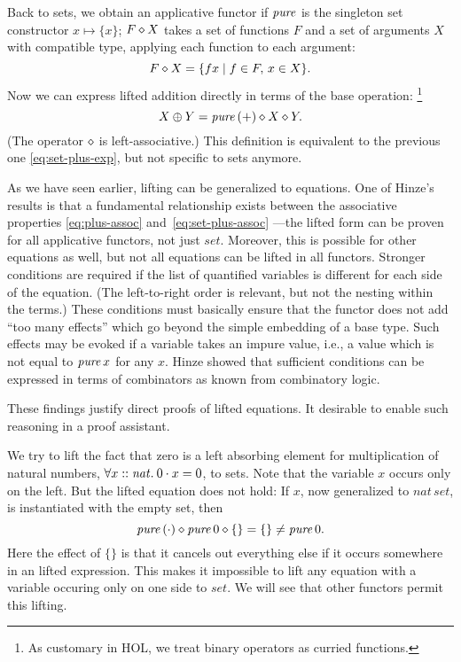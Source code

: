 \addtocounter{example}{-1}
\begin{example}[continued]
Back to sets, we obtain an applicative functor if $\operatorname{\mathit{pure}}$ is the singleton set
constructor $x \mapsto \{x\}$;
$F \diamond X$ takes a set of functions $F$ and a set of arguments $X$
with compatible type, applying each function to each argument:
\begin{equation}\label{eq:set-ap}
	F \diamond X = \{f x\mid f \in F,\, x \in X\}.
\end{equation}
Now we can express lifted addition directly in terms of the base operation:%
\footnote{As customary in HOL, we treat binary operators as curried functions.}
\begin{equation}\label{eq:set-plus}
	X \oplus Y = \operatorname{\mathit{pure}}{(+)} \diamond X \diamond Y.
\end{equation}
(The operator $\diamond$ is left-associative.)
This definition is equivalent to the previous one \eqref{eq:set-plus-exp},
but not specific to sets anymore.
\end{example}

As we have seen earlier, lifting can be generalized to equations.
One of Hinze's results is that a fundamental relationship exists between the
associative properties \eqref{eq:plus-assoc} and~\eqref{eq:set-plus-assoc}%
---the lifted form can be proven for all applicative functors, not just
$\mathit{set}$.
Moreover, this is possible for other equations as well, but not all equations
can be lifted in all functors.
Stronger conditions are required if the list of quantified variables is
different for each side of the equation.
(The left-to-right order is relevant, but not the nesting within the terms.)
These conditions must basically ensure that the functor does not add ``too many
effects'' which go beyond the simple embedding of a base type.
Such effects may be evoked if a variable takes an impure value, i.e., a value
which is not equal to $\operatorname{\mathit{pure}} x$ for any $x$.
Hinze showed that sufficient conditions can be expressed in terms of combinators
as known from combinatory logic.

These findings justify direct proofs of lifted equations.
It desirable to enable such reasoning in a proof assistant.

\begin{example}\label{exmp:set-counterexmp}
We try to lift the fact that zero is a left absorbing element for
multiplication of natural numbers, $\forall x \mathrel{::} \mathit{nat}.\>0 \cdot x = 0$,
to sets.
Note that the variable $x$ occurs only on the left.
But the lifted equation does not hold: If $x$, now generalized to
$\mathit{nat}\,\mathit{set}$, is instantiated with the empty set, then
\[ \operatorname{\mathit{pure}}{(\cdot)} \diamond \operatorname{\mathit{pure}} 0 \diamond \{\} = \{\} \ne \operatorname{\mathit{pure}} 0. \]
Here the effect of $\{\}$ is that it cancels out everything else if it occurs
somewhere in an lifted expression.
This makes it impossible to lift any equation with a variable occuring only on
one side to $\mathit{set}$.
We will see that other functors permit this lifting.
\end{example}


